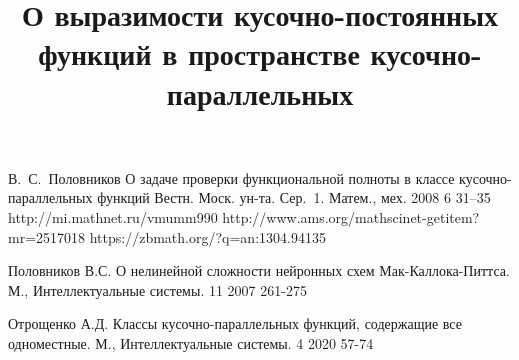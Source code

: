 \documentclass[a4paper]{article}
\theoremstyle{plain}
\theoremstyle{definition}
\begin{document}
\title{О выразимости кусочно-постоянных функций в пространстве кусочно-параллельных}







\begin{thebibliography}{99}

  В.~С.~Половников
   О задаче проверки функциональной полноты в классе кусочно-параллельных функций
   Вестн. Моск. ун-та. Сер.~1. Матем., мех.
   2008
   6
   31--35
  {http://mi.mathnet.ru/vmumm990}
  {http://www.ams.org/mathscinet-getitem?mr=2517018}
  {https://zbmath.org/?q=an:1304.94135}

  Половников В.С.
  О нелинейной сложности нейронных схем Мак-Каллока-Питтса.
   М., Интеллектуальные системы.
   11
   2007
   261-275

   Отрощенко А.Д.
   Классы кусочно-параллельных функций, содержащие все одноместные.
    М., Интеллектуальные системы.
   4
   2020
   57-74

\end{thebibliography}
\end{document}
